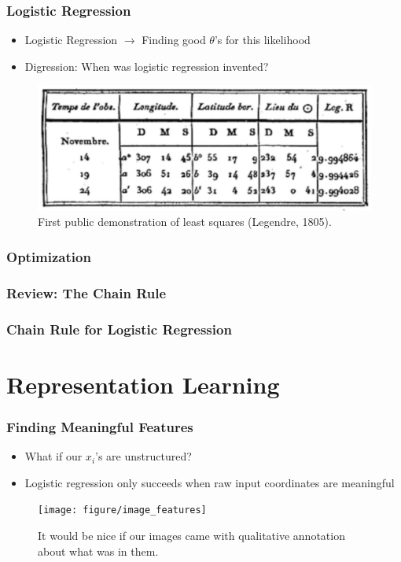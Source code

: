 \documentclass[10pt,mathserif]{beamer}
\begin{document}
\begin{frame}
  \frametitle{Logistic Regression}
  \begin{itemize}
  \item Logistic Regression $\rightarrow$ Finding good $\theta$'s for this
    likelihood
  \item Digression: When was logistic regression invented?
  \end{itemize}
  \begin{figure}[ht]
    \centering
    \includegraphics[width=0.7\paperwidth]{figure/least_squares}
    \caption{First public demonstration of least squares (Legendre,
      1805). \label{fig:least_squares} }
  \end{figure}
\end{frame}

\begin{frame}
  \frametitle{Optimization}
\end{frame}

\begin{frame}
  \frametitle{Review: The Chain Rule}
\end{frame}

\begin{frame}
  \frametitle{Chain Rule for Logistic Regression}
\end{frame}

\section{Representation Learning}

\begin{frame}
  \frametitle{Finding Meaningful Features}
 \begin{itemize}
 \item What if our $x_i$'s are unstructured?
 \item Logistic regression only succeeds when raw input coordinates are
   meaningful
 \end{itemize} 
 \begin{figure}[ht]
   \centering
   \texttt{[image: figure/image\_features]}
   \caption{It would be nice if our images came with qualitative annotation
     about what was in them. \label{fig:image_features} }
 \end{figure}
\end{frame}
\end{document}
